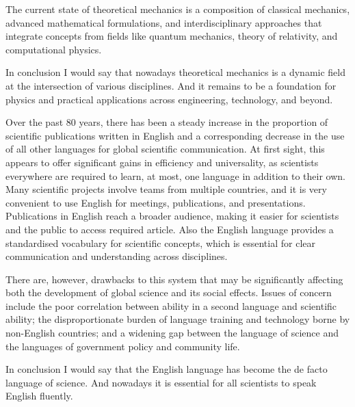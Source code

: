 \documentclass[main.tex]{subfiles}
\begin{document}

\newpage

\setcounter{subsection}{7}

The current state of theoretical mechanics is a composition of classical mechanics, advanced mathematical formulations, and interdisciplinary approaches that integrate concepts from fields like quantum mechanics, theory of relativity, and computational physics.

In conclusion I would say that nowadays theoretical mechanics is a dynamic field at the intersection of various disciplines.
And it remains to be a foundation for physics and practical applications across engineering, technology, and beyond.
\\


\newpage

\setcounter{subsection}{8}

Over the past 80 years, there has been a steady increase in the proportion of scientific publications written in English and a corresponding decrease in the use of all other languages for global scientific communication.
At first sight, this appears to offer significant gains in efficiency and universality, as scientists everywhere are required to learn, at most, one language in addition to their own.
Many scientific projects involve teams from multiple countries, and it is very convenient to use English for meetings, publications, and presentations.
Publications in English reach a broader audience, making it easier for scientists and the public to access required article.
Also the English language provides a standardised vocabulary for scientific concepts, which is essential for clear communication and understanding across disciplines.

There are, however, drawbacks to this system that may be significantly affecting both the development of global science and its social effects.
Issues of concern include the poor correlation between ability in a second language and scientific ability; the disproportionate burden of language training and technology borne by non-English countries; and a widening gap between the language of science and the languages of government policy and community life.

In conclusion I would say that the English language has become the de facto language of science. And nowadays it is essential for all scientists to speak English fluently.
\\

\end{document}
